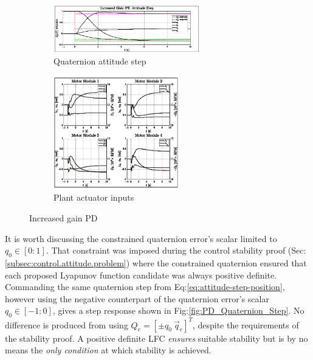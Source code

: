 \begin{figure}[htbp]
\vspace{-10pt}
\centering
\begin{subfigure}{\textwidth}
\centering
\includegraphics[width=0.7\textwidth]{graphs/PD_Diagonal_Gain_Step}
\vspace{-6pt}
\caption{Quaternion attitude step}
\label{fig:PD_Diagonal_Gain_Step}
\end{subfigure}
\begin{subfigure}{\textwidth}
\centering
\includegraphics[width=0.6\textwidth]{graphs/PD_Diagonal_Gain_Input}
\vspace{-8pt}
\caption{Plant actuator inputs}
\label{fig:PD_Diagonal_Gain_Input}
\end{subfigure}
\vspace{-8pt}
\caption{Increased gain PD}
\vspace{-16pt}
\end{figure}
\par
It is worth discussing the constrained quaternion error's scalar limited to $q_0\in[0:1]$. That constraint was imposed during the control stability proof (Sec:\ref{subsec:control.attitude.problem}) where the constrained quaternion ensured that each proposed Lyapunov function candidate was always positive definite. Commanding the same quaternion step from Eq:\ref{eq:attitude-step-position}, however using the negative counterpart of the quaternion error's scalar  $q_0\in[-1:0]$, gives a step response shown in Fig:\ref{fig:PD_Quaternion_Step}. No difference is produced from using $Q_e=[\pm q_0~\vec{q}_e]^T$, despite the requirements of the stability proof. A positive definite LFC \emph{ensures} suitable stability but is by no means the \emph{only condition} at which stability is achieved.
